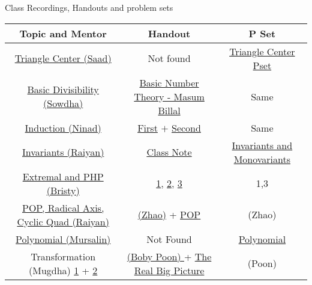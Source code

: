 \documentclass{article}
\begin{document}
	\begin{center}
		Class Recordings, Handouts and problem sets 
		\begin{tabular}{|c|c|c|}
			\hline 
			Topic and Mentor & Handout & P Set \\
			\hline
			\href{https://www.youtube.com/watch?v=gWAeVwjzndQ}{Triangle Center (Saad)} & Not found & \href{https://drive.google.com/file/d/1JISJtfI-zb_jadi_gM5iWcz1ao4Dw4J8/view}{Triangle Center Pset} \\
			\hline 
			\href{https://www.youtube.com/watch?v=2LoYjvi0MH4}{Basic Divisibility (Sowdha)} & \href{https://drive.google.com/file/d/1YRvC4AQ2rwa4DsQxYd_7kHqyYZdrPQkX/view?usp=sharing}{Basic Number Theory - Masum Billal} & Same \\
			\hline 
			\href{https://www.youtube.com/watch?v=C-0pRTD4H0w}{Induction (Ninad)} & \href{https://drive.google.com/file/d/1Z1h4jfZvrb69Jrayc0IMmopX9yzz9Z_L/view?usp=sharing}{First} \(+\) \href{https://drive.google.com/file/d/12zWftwXBXeYKMCBMGh-cPhG69r0zoc99/view}{Second} & Same \\
			\hline 
			\href{https://www.youtube.com/watch?v=hInrF3biygw}{Invariants (Raiyan)} & \href{https://drive.google.com/file/d/1Ndgs_ftSaG1Ph5sJYsIbwgGczM_NNgrW/view}{Class Note} & \href{https://drive.google.com/file/d/15XjviqGWzT3T_7-W7g2axDdOXiE2le8K/view}{Invariants and Monovariants} \\
			\hline 
			\href{https://www.youtube.com/watch?v=cYTssF84f9g}{Extremal and PHP (Bristy)} & \href{https://drive.google.com/file/d/1sSvTee9gw9lAKwC0n6vyik79VrKpIiv6/view}{1}, \href{https://drive.google.com/file/d/17ps5RJ-FABW7CiSIj87zjC9de9FJyfn-/view}{2}, \href{https://drive.google.com/file/d/1_fbjgE7eFvVpFKNljJS24cN8NbPklCJu/view}{3} & 1,3 \\
			\hline
			\href{https://www.youtube.com/watch?v=iEilRQH6uL0}{POP, Radical Axis, Cyclic Quad (Raiyan)} & \href{https://drive.google.com/file/d/1PlsMrV70QsknXCm5qDsRG5RIhLID_6rL/view}{(Zhao)} + \href{https://drive.google.com/file/d/1I53hLdluSuuN7O7Cuu4teubpSaxvwImZ/view}{POP} & (Zhao) \\ 
			\hline
			\href{https://www.youtube.com/watch?v=w52vpcuTAwo}{Polynomial (Mursalin)} & Not Found & 
			\href{https://drive.google.com/file/d/1SoVQm_j-osYbXPg7ZHeS3hQdGCw9m0Yo/view}{Polynomial} \\
			\hline 
			{Transformation (Mugdha) \href{https://www.youtube.com/watch?v=yohxAxqnCt8}{1} + \href{https://www.youtube.com/watch?v=7tAmJ8cvmYM}{2}} & \href{https://drive.google.com/file/d/1_XBfSBLO3NSWAKw9_mkhYPIWgkRfwm2Z/view}{(Boby Poon) } + \href{https://drive.google.com/file/d/11kMt5af6pfZDoaV932MsEf6Sx0vvznsk/view}{The Real Big Picture} & (Poon) \\

\end{tabular}
\end{center}
\end{document}
